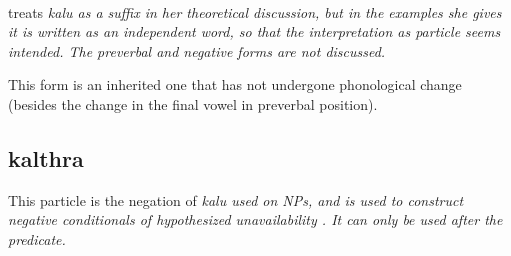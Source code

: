  \\






\citep{Jayasuriya2002} treats \em kalu \em as a suffix in her theoretical discussion, but in the examples she gives it is written as an independent word, so that the interpretation as particle seems intended.  The preverbal and negative forms are not discussed.

This form is an inherited one that has not undergone phonological change (besides the change in the final vowel in preverbal position).




\subsection{kalthra}\label{sec:wc:kalthra}
This particle is the negation of \em kalu \em used on NPs, and is used to construct negative conditionals of hypothesized unavailability  .  It can only be used after the predicate.

